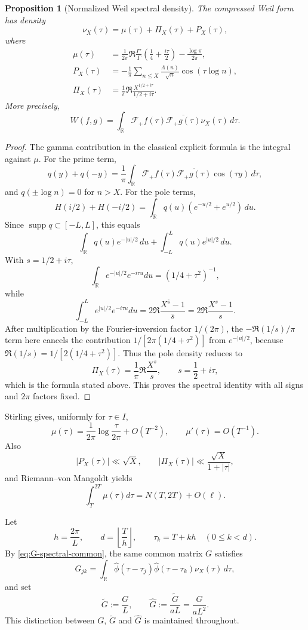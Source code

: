 \documentclass[11pt]{article}
\newtheorem{proposition}[theorem]{Proposition}
\newcommand{\R}{\mathbb R}
\begin{document}
\begin{proposition}[Normalized Weil spectral density]\label{aiii:lem:spectral}
The compressed Weil form has density
\[
 \nu_X(\tau)=\mu(\tau)+\Pi_X(\tau)+P_X(\tau),
\]
where
\begin{align}
 \mu(\tau)
 &=\frac1{2\pi}\Re\frac{\Gamma'}{\Gamma}
 \left(\frac14+\frac{i\tau}{2}\right)
 -\frac{\log\pi}{2\pi},\\
 P_X(\tau)
 &=-\frac1\pi\sum_{n\le X}\frac{\Lambda(n)}{\sqrt n}
 \cos(\tau\log n),\\
 \Pi_X(\tau)
 &=\frac1\pi\Re\frac{X^{1/2+i\tau}}{1/2+i\tau}.
\end{align}
More precisely,
\[
 W(f,g)=\int_\R
 \mathcal F_+f(\tau)\overline{\mathcal F_+g(\tau)}
 \nu_X(\tau)\,d\tau.
\]
\end{proposition}

\begin{proof}
The gamma contribution in the classical explicit formula is the integral
against $\mu$.  For the prime term,
\[
 q(y)+q(-y)
 =\frac1\pi\int_\R
 \mathcal F_+f(\tau)\overline{\mathcal F_+g(\tau)}
 \cos(\tau y)\,d\tau,
\]
and $q(\pm\log n)=0$ for $n>X$.
For the pole terms,
\[
 H(i/2)+H(-i/2)
 =\int_{\R}q(u)(e^{-u/2}+e^{u/2})\,du.
\]
Since $\operatorname{supp}q\subset[-L,L]$, this equals
\[
 \int_{\R}q(u)e^{-|u|/2}\,du
 +
 \int_{-L}^{L}q(u)e^{|u|/2}\,du.
\]
With $s=1/2+i\tau$,
\[
 \int_\R e^{-|u|/2}e^{-i\tau u}du=(1/4+\tau^2)^{-1},
\]
while
\[
 \int_{-L}^Le^{|u|/2}e^{-i\tau u}du
 =
 2\Re\frac{X^{\bar s}-1}{\bar s}
 =
 2\Re\frac{X^s-1}{s}.
\]
After multiplication by the Fourier-inversion factor $1/(2\pi)$, the
$-\Re(1/s)/\pi$ term here cancels the contribution
$1/[2\pi(1/4+\tau^2)]$ from $e^{-|u|/2}$, because
$\Re(1/s)=1/[2(1/4+\tau^2)]$.  Thus the pole density reduces to
\[
 \Pi_X(\tau)=\frac1\pi\Re\frac{X^s}{s},
 \qquad s=\frac12+i\tau,
\]
which is the formula stated above.  This proves the spectral identity with
all signs and $2\pi$ factors fixed.
\end{proof}

Stirling gives, uniformly for $\tau\in I$,
\[
 \mu(\tau)=\frac1{2\pi}\log\frac{\tau}{2\pi}+O(T^{-2}),
 \qquad \mu'(\tau)=O(T^{-1}).
\]
Also
\[
 |P_X(\tau)|\ll\sqrt X,\qquad
 |\Pi_X(\tau)|\ll\frac{\sqrt X}{1+|\tau|},
\]
and Riemann--von Mangoldt yields
\[
 \int_T^{2T}\mu(\tau)d\tau=N(T,2T)+O(\ell).
\]

Let
\[
 h=\frac{2\pi}{L},\qquad
 d=\left\lfloor\frac{T}{h}\right\rfloor,
 \qquad \tau_k=T+kh\quad(0\le k<d).
\]
By \eqref{eq:G-spectral-common}, the same common matrix $G$ satisfies
\[
 G_{jk}=\int_\R
 \widehat\phi(\tau-\tau_j)\widehat\phi(\tau-\tau_k)
 \nu_X(\tau)\,d\tau,
\]
and set
\[
 \widetilde G:=\frac{G}{L},\qquad
 \widehat G:=\frac{\widetilde G}{aL}=\frac{G}{aL^2}.
\]
This distinction between $G$, $\widetilde G$ and $\widehat G$ is maintained
throughout.
\end{document}
